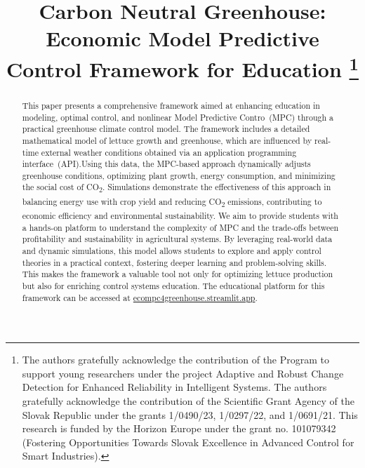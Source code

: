 \documentclass[conference]{IEEEtran}
\begin{document}
\title{Carbon Neutral Greenhouse: Economic Model Predictive Control Framework for Education
    \thanks{The authors gratefully acknowledge the contribution of the Program to support young researchers under the project Adaptive and Robust Change Detection for Enhanced Reliability in Intelligent Systems. The authors gratefully acknowledge the contribution of the Scientific Grant Agency of the Slovak Republic under the grants 1/0490/23, 1/0297/22, and 1/0691/21. This research is funded by the Horizon Europe under the grant no. 101079342 (Fostering Opportunities Towards Slovak Excellence in Advanced Control for Smart Industries).}
}

\author{
}

\maketitle

\begin{abstract}
    This paper presents a comprehensive framework aimed at enhancing education in modeling, optimal control, and nonlinear Model Predictive Contro~(MPC) through a practical greenhouse climate control model. The framework includes a detailed mathematical model of lettuce growth and greenhouse, which are influenced by real-time external weather conditions obtained via an application programming interface~(API).\@ Using this data, the MPC-based approach dynamically adjusts greenhouse conditions, optimizing plant growth, energy consumption, and minimizing the social cost of CO\textsubscript{2}. Simulations demonstrate the effectiveness of this approach in balancing energy use with crop yield and reducing CO\textsubscript{2} emissions, contributing to economic efficiency and environmental sustainability.
    We aim to provide students with a hands-on platform to understand the complexity of MPC and the trade-offs between profitability and sustainability in agricultural systems. By leveraging real-world data and dynamic simulations, this model allows students to explore and apply control theories in a practical context, fostering deeper learning and problem-solving skills. This makes the framework a valuable tool not only for optimizing lettuce production but also for enriching control systems education. The educational platform for this framework can be accessed at \url{ecompc4greenhouse.streamlit.app}.
\end{abstract}
\end{document}
